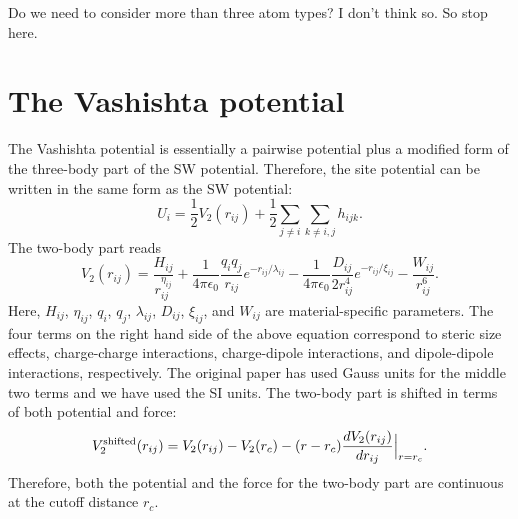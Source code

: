 \documentclass[12pt,a4paper]{report}
\begin{document}
Do we need to consider more than three atom types? I don't think so. So stop here. 


\section{The Vashishta potential}

The Vashishta potential \cite{vashishta2007jap} is essentially a pairwise potential plus a modified form of the three-body part of the SW potential. Therefore, the site potential can be written in the same form as the SW potential:
\begin{equation}
U_i = \frac{1}{2} V_2(r_{ij}) + \frac{1}{2}\sum_{j\neq i}\sum_{k\neq i,j} h_{ijk}.
\end{equation}
The two-body part reads
\begin{equation}
V_2(r_{ij}) =  
\frac{H_{ij}}{r_{ij}^{\eta_{ij}}} + 
\frac{1}{4\pi\epsilon_0} \frac{q_{i}q_{j}}{r_{ij}} e^{-r_{ij}/\lambda_{ij}} -
\frac{1}{4\pi\epsilon_0} \frac{D_{ij}}{2r_{ij}^4} e^{-r_{ij}/\xi_{ij}}  -
\frac{W_{ij}}{r_{ij}^6}.
\end{equation}
Here, $H_{ij}$, $\eta_{ij}$, $q_{i}$, $q_{j}$, $\lambda_{ij}$, $D_{ij}$, $\xi_{ij}$, and $W_{ij}$ are material-specific parameters. The four terms on the right hand side of the above equation correspond to steric size effects, charge-charge interactions, charge-dipole interactions, and dipole-dipole interactions, respectively. The original paper \cite{vashishta2007jap} has used Gauss units for the middle two terms and we have used the SI units. The two-body part is shifted in terms of both potential and force:
\begin{equation}
V_2^{\rm shifted}(r_{ij}) = V_2(r_{ij}) - V_2(r_{c}) -(r-r_c) \frac{dV_2(r_{ij})}{dr_{ij}}\Big|_{r=r_c}.
\end{equation}
Therefore, both the potential and the force for the two-body part are continuous at the cutoff distance $r_c$.
\end{document}

